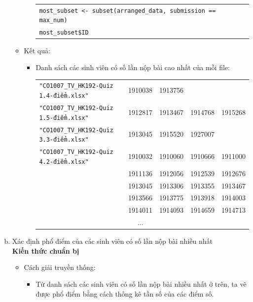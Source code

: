\documentclass[a4paper]{article}
\theoremstyle{definition}
\begin{document}
\begin{enumerate}[a)]
\begin{itemize}
\begin{itemize}
            \begin{center}
                \begin{tabular}{p{13cm}}
                    \texttt{most\_subset <- subset(arranged\_data, submission == max\_num)}\\
                    \texttt{most\_subset\$ID}
                \end{tabular}
            \end{center}
        \end{itemize}
        \item Kết quả:
        \begin{itemize}
            \item Danh sách các sinh viên có số lần nộp bài cao nhất của mỗi file:
            \begin{center}
                \begin{tabular}{l c c c c}
                     \texttt{"CO1007\_TV\_HK192-Quiz 1.4-điểm.xlsx"} & 1910038 & 1913756\\
                     \texttt{"CO1007\_TV\_HK192-Quiz 1.5-điểm.xlsx"} & 1912817 & 1913467 & 1914768 & 1915268\\
                     \texttt{"CO1007\_TV\_HK192-Quiz 3.3-điểm.xlsx"} & 1913045 & 1915520 & 1927007\\
                     \texttt{"CO1007\_TV\_HK192-Quiz 4.2-điểm.xlsx"} & 1910032 & 1910060 & 1910666 & 1911000 \\ & 1911136 & 1912056 & 1912539 & 1912676 \\ & 1913045 & 1913306 & 1913355 & 1913467 \\ & 1913566 & 1913775 & 1913918 & 1914003 \\ & 1914011 & 1914093 & 1914659 & 1914713\\
                     & ...
                \end{tabular}
            \end{center}
        \end{itemize}
    \end{itemize}
    \bf\item {Xác định phổ điểm của các sinh viên có số lần nộp bài nhiều nhất}\\[6pt]
    \bf Kiến thức chuẩn bị\normalfont
    \begin{itemize}
        \item Cách giải truyền thống:
        \begin{itemize}
            \item Từ danh sách các sinh viên có số lần nộp bài nhiều nhất ở trên, ta vẽ được phổ điểm bằng cách thống kê tần số của các điểm số.

\end{itemize}
\end{itemize}
\end{enumerate}
\end{document}
